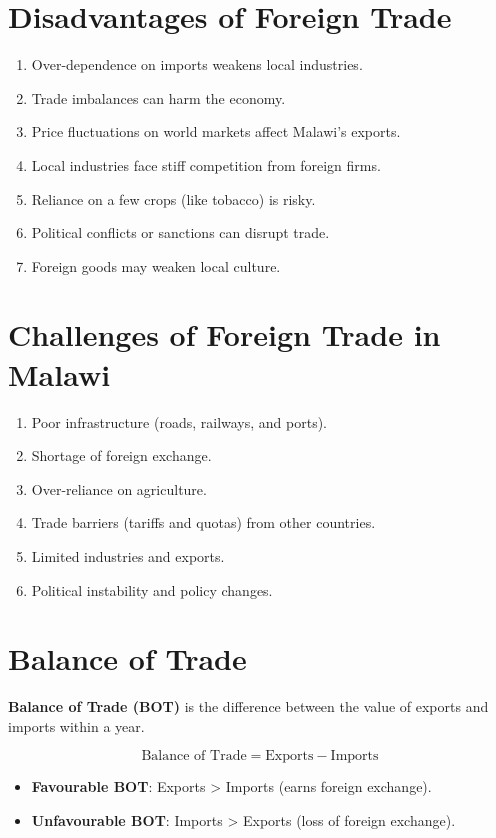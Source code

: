 \documentclass[14pt,a4paper, openany]{book}
\begin{document}
\section{Disadvantages of Foreign Trade}
\begin{enumerate}
	\item Over-dependence on imports weakens local industries.
	\item Trade imbalances can harm the economy.
	\item Price fluctuations on world markets affect Malawi’s exports.
	\item Local industries face stiff competition from foreign firms.
	\item Reliance on a few crops (like tobacco) is risky.
	\item Political conflicts or sanctions can disrupt trade.
	\item Foreign goods may weaken local culture.
\end{enumerate}

\section{Challenges of Foreign Trade in Malawi}
\begin{enumerate}
	\item Poor infrastructure (roads, railways, and ports).
	\item Shortage of foreign exchange.
	\item Over-reliance on agriculture.
	\item Trade barriers (tariffs and quotas) from other countries.
	\item Limited industries and exports.
	\item Political instability and policy changes.
\end{enumerate}

\section{Balance of Trade}
\textbf{Balance of Trade (BOT)} is the difference between the value of exports and imports within a year.

\[
	\text{Balance of Trade} = \text{Exports} - \text{Imports}
\]

\begin{itemize}
	\item \textbf{Favourable BOT}: Exports > Imports (earns foreign exchange).
	\item \textbf{Unfavourable BOT}: Imports > Exports (loss of foreign exchange).
\end{itemize}
\end{document}
